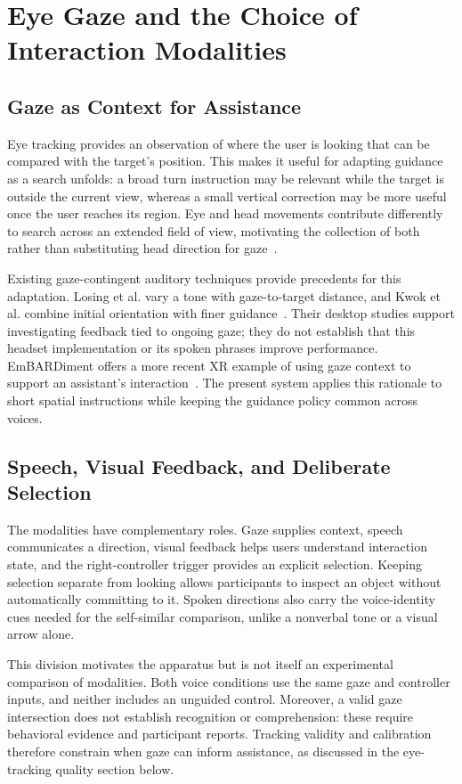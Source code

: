 \section{Eye Gaze and the Choice of Interaction Modalities}
\subsection{Gaze as Context for Assistance}
Eye tracking provides an observation of where the user is looking that can be compared with the target's position. This makes it useful for adapting guidance as a search unfolds: a broad turn instruction may be relevant while the target is outside the current view, whereas a small vertical correction may be more useful once the user reaches its region. Eye and head movements contribute differently to search across an extended field of view, motivating the collection of both rather than substituting head direction for gaze~\cite{stein2024eyehead}.

Existing gaze-contingent auditory techniques provide precedents for this adaptation. Losing et al. vary a tone with gaze-to-target distance, and Kwok et al. combine initial orientation with finer guidance~\cite{losing2014guiding,kwok2022twostep}. Their desktop studies support investigating feedback tied to ongoing gaze; they do not establish that this headset implementation or its spoken phrases improve performance. EmBARDiment offers a more recent XR example of using gaze context to support an assistant's interaction~\cite{bovo2025embardiment}. The present system applies this rationale to short spatial instructions while keeping the guidance policy common across voices.

\subsection{Speech, Visual Feedback, and Deliberate Selection}
The modalities have complementary roles. Gaze supplies context, speech communicates a direction, visual feedback helps users understand interaction state, and the right-controller trigger provides an explicit selection. Keeping selection separate from looking allows participants to inspect an object without automatically committing to it. Spoken directions also carry the voice-identity cues needed for the self-similar comparison, unlike a nonverbal tone or a visual arrow alone.

This division motivates the apparatus but is not itself an experimental comparison of modalities. Both voice conditions use the same gaze and controller inputs, and neither includes an unguided control. Moreover, a valid gaze intersection does not establish recognition or comprehension: these require behavioral evidence and participant reports. Tracking validity and calibration therefore constrain when gaze can inform assistance, as discussed in the eye-tracking quality section below.

